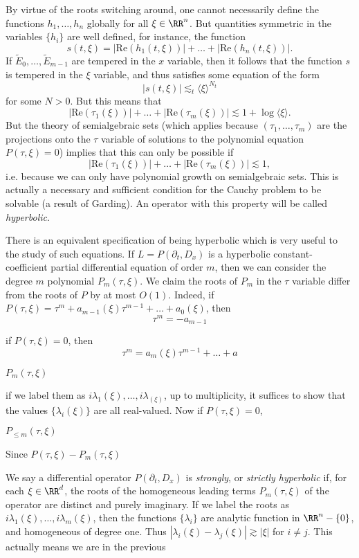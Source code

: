 By virtue of the roots switching around, one cannot necessarily define the functions $h_1,\dots,h_n$ globally for all $\xi \in \RR^n$. But quantities symmetric in the variables $\{ h_i \}$ are well defined, for instance, the function
%
\[ s(t,\xi) = |\text{Re}(h_1(t,\xi))| + \dots + |\text{Re}(h_n(t,\xi))|. \]
%
If $\tilde{E}_0,\dots,\tilde{E}_{m-1}$ are tempered in the $x$ variable, then it follows that the function $s$ is tempered in the $\xi$ variable, and thus satisfies some equation of the form
%
\[ |s(t,\xi)| \lesssim_t \langle \xi \rangle^{N_t} \]
%
for some $N > 0$. But this means that
%
\[ |\text{Re}(\tau_1(\xi))| + \dots + |\text{Re}(\tau_m(\xi))| \lesssim 1 + \log \langle \xi \rangle. \]
%
But the theory of semialgebraic sets (which applies because $(\tau_1,\dots,\tau_m)$ are the projections onto the $\tau$ variable of solutions to the polynomial equation $P(\tau,\xi) = 0$) implies that this can only be possible if
%
\[ |\text{Re}(\tau_1(\xi))| + \dots + |\text{Re}(\tau_m(\xi))| \lesssim 1, \]
%
i.e. because we can only have polynomial growth on semialgebraic sets. This is actually a necessary and sufficient condition for the Cauchy problem to be solvable (a result of Garding). An operator with this property will be called \emph{hyperbolic}.

There is an equivalent specification of being hyperbolic which is very useful to the study of such equations. If $L = P(\partial_t, D_x)$ is a hyperbolic constant-coefficient partial differential equation of order $m$, then we can consider the degree $m$ polynomial $P_m(\tau,\xi)$. We claim the roots of $P_m$ in the $\tau$ variable differ from the roots of $P$ by at most $O(1)$. Indeed, if $P(\tau,\xi) = \tau^m + a_{m-1}(\xi) \tau^{m-1} + \dots + a_0(\xi)$, then
%
\[ \tau^m = - a_{m-1} \]

if $P(\tau,\xi) = 0$, then
%
\[ \tau^m = a_m(\xi) \tau^{m-1} + \dots + a \]

$P_m(\tau,\xi)$


if we label them as $i \lambda_1(\xi), \dots, i \lambda_(\xi)$, up to multiplicity, it suffices to show that the values $\{ \lambda_i(\xi) \}$ are all real-valued. Now if $P(\tau,\xi) = 0$, 

$P_{\leq m}(\tau,\xi)$

Since $P(\tau,\xi) - P_m(\tau,\xi)$

We say a differential operator $P(\partial_t, D_x)$ is \emph{strongly}, or \emph{strictly hyperbolic} if, for each $\xi \in \RR^d$, the roots of the homogeneous leading terms $P_m(\tau, \xi)$ of the operator are distinct and purely imaginary. If we label the roots as $i \lambda_1(\xi), \dots, i \lambda_m(\xi)$, then the functions $\{ \lambda_i \}$ are analytic function in $\RR^n - \{ 0 \}$, and homogeneous of degree one. Thus $|\lambda_i(\xi) - \lambda_j(\xi)| \gtrsim |\xi|$ for $i \neq j$. This actually means we are in the previous 

